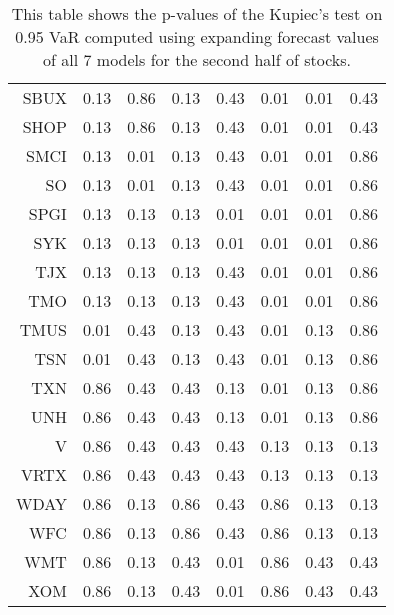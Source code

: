 \begin{table}[ht]
\begin{tabular}{rrrrrrrr}
  SBUX & 0.13 & 0.86 & 0.13 & 0.43 & 0.01 & 0.01 & 0.43 \\ 
  SHOP & 0.13 & 0.86 & 0.13 & 0.43 & 0.01 & 0.01 & 0.43 \\ 
  SMCI & 0.13 & 0.01 & 0.13 & 0.43 & 0.01 & 0.01 & 0.86 \\ 
  SO & 0.13 & 0.01 & 0.13 & 0.43 & 0.01 & 0.01 & 0.86 \\ 
  SPGI & 0.13 & 0.13 & 0.13 & 0.01 & 0.01 & 0.01 & 0.86 \\ 
  SYK & 0.13 & 0.13 & 0.13 & 0.01 & 0.01 & 0.01 & 0.86 \\ 
  TJX & 0.13 & 0.13 & 0.13 & 0.43 & 0.01 & 0.01 & 0.86 \\ 
  TMO & 0.13 & 0.13 & 0.13 & 0.43 & 0.01 & 0.01 & 0.86 \\ 
  TMUS & 0.01 & 0.43 & 0.13 & 0.43 & 0.01 & 0.13 & 0.86 \\ 
  TSN & 0.01 & 0.43 & 0.13 & 0.43 & 0.01 & 0.13 & 0.86 \\ 
  TXN & 0.86 & 0.43 & 0.43 & 0.13 & 0.01 & 0.13 & 0.86 \\ 
  UNH & 0.86 & 0.43 & 0.43 & 0.13 & 0.01 & 0.13 & 0.86 \\ 
  V & 0.86 & 0.43 & 0.43 & 0.43 & 0.13 & 0.13 & 0.13 \\ 
  VRTX & 0.86 & 0.43 & 0.43 & 0.43 & 0.13 & 0.13 & 0.13 \\ 
  WDAY & 0.86 & 0.13 & 0.86 & 0.43 & 0.86 & 0.13 & 0.13 \\ 
  WFC & 0.86 & 0.13 & 0.86 & 0.43 & 0.86 & 0.13 & 0.13 \\ 
  WMT & 0.86 & 0.13 & 0.43 & 0.01 & 0.86 & 0.43 & 0.43 \\ 
  XOM & 0.86 & 0.13 & 0.43 & 0.01 & 0.86 & 0.43 & 0.43 \\ 
   \hline
\end{tabular}
\caption[Kupiec's test p-values, alpha =0.95 (2)]{This table shows the p-values of the Kupiec's test on 0.95 VaR computed using expanding forecast values of all 7 models for the second half of stocks.} 
\label{Table:Kupiec_test_expanding_0.95_2}
\end{table}
